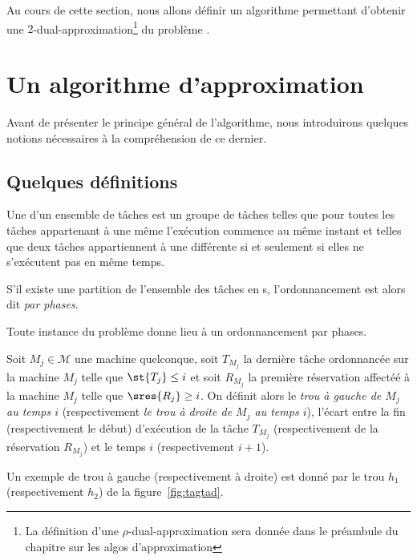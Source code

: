 \documentclass[a4paper,9pt]{article}
\begin{document}
Au cours de cette section, nous allons définir un algorithme permettant d'obtenir une
$2$-dual-approximation\footnote{La définition d'une $\rho$-dual-approximation sera donnée dans le
préambule du chapitre sur les algos d'approximation} du problème \unitfisched{}. 

\section{Un algorithme d'approximation}

Avant de présenter le principe général de l'algorithme, nous introduirons quelques notions
nécessaires à la compréhension de ce dernier.

\subsection{Quelques définitions}

\begin{ndf}[Phases]
    Une \tphase{} d'un ensemble de tâches est un groupe de tâches telles que pour toutes les tâches
    appartenant à une même \tphase{} l'exécution commence au même instant et telles que deux tâches
    appartiennent à une \tphase{} différente si et seulement si elles ne s'exécutent pas en même
    temps.

    S'il existe une partition de l'ensemble des tâches en \tphase{}s, l'ordonnancement est alors dit
    \emph{par phases}.
\end{ndf}

\begin{nprop}
    Toute instance du problème \unitfisched{} donne lieu à un ordonnancement par phases.
\end{nprop}


\begin{ndf}
    Soit $M_j \in \mathcal{M}$ une machine quelconque, soit $T_{M_j}$ la dernière tâche ordonnancée
    sur la machine $M_j$ telle que $\st{T_j} \leq i$ et soit $R_{M_j}$ la première réservation
    affectéé à la machine $M_j$ telle que $\sres{R_j} \geq i$. On définit alors le \emph{trou à gauche
    de $M_j$ au temps $i$} (respectivement \emph{le trou à droite de $M_j$ au temps $i$}), l'écart
    entre la fin (respectivement le début) d'exécution de la tâche $T_{M_j}$ (respectivement de la
    réservation $R_{M_j}$) et le temps $i$ (respectivement $i+1$).

    Un exemple de trou à gauche (respectivement à droite) est donné par le trou $h_1$
    (respectivement $h_2$) de la figure~\ref{fig:tagtad}.
\end{ndf}
\end{document}
